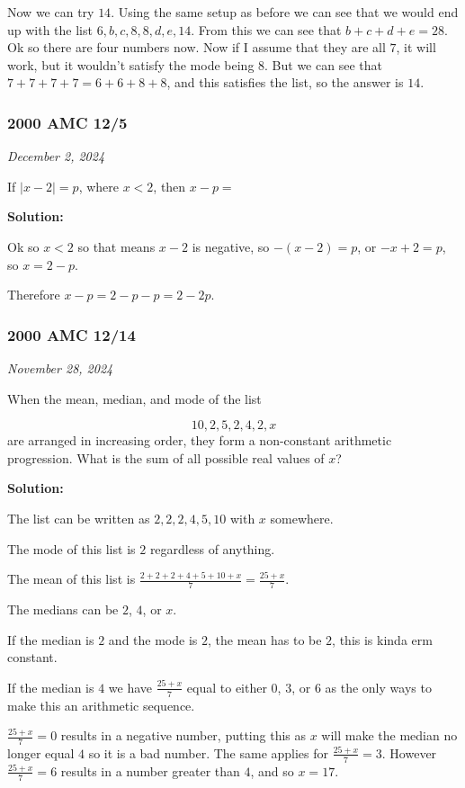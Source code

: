 \documentclass[../mathproblems.tex]{subfiles}
\begin{document}
Now we can try $14$. Using the same setup as before we can see that we would end up with the list $6,b,c,8,8,d,e,14$. From this we can see that $b+c+d+e = 28$. Ok so there are four numbers now. Now if I assume that they are all $7$, it will work, but it wouldn't satisfy the mode being $8$. But we can see that $7+7+7+7 = 6+6+8+8$, and this satisfies the list, so the answer is $\boxed{14}$.

\noindent\hrulefill




\subsubsection*{2000 AMC 12/5} 
\textit{December 2, 2024}

If $|x - 2| = p$, where $x < 2$, then $x - p =$

\textbf{Solution:}

Ok so $x<2$ so that means $x-2$ is negative, so $-(x-2) = p$, or $-x+2 = p$, so $x=2-p$.

Therefore $x-p = 2-p-p = \boxed{2-2p}$.

\noindent\hrulefill
\subsubsection*{2000 AMC 12/14} 
\textit{November 28, 2024}

When the mean, median, and mode of the list

\[10,2,5,2,4,2,x\]
are arranged in increasing order, they form a non-constant arithmetic progression. What is the sum of all possible real values of $x$?

\textbf{Solution:}

The list can be written as $2,2,2,4,5,10$ with $x$ somewhere.

The mode of this list is $2$ regardless of anything.

The mean of this list is $\frac{2+2+2+4+5+10+x}{7} = \frac{25+x}{7}$.

The medians can be $2$, $4$, or $x$.

If the median is $2$ and the mode is $2$, the mean has to be $2$, this is kinda erm constant.

If the median is $4$ we have $\frac{25+x}{7}$ equal to either $0$, $3$, or $6$ as the only ways to make this an arithmetic sequence.

$\frac{25+x}{7} = 0$ results in a negative number, putting this as $x$ will make the median no longer equal $4$ so it is a bad number. The same applies for $\frac{25+x}{7} = 3$. However $\frac{25+x}{7}=6$ results in a number greater than $4$, and so $x=17$.
\end{document}
